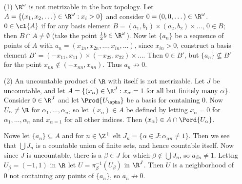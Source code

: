 \begin{example}
    \begin{enumerate}
        \item[(1)] $\R^{\omega}$ is not metrizable in the box topology. Let $A=\{(x_1,x_2,\dots) \in
            \R^{\omega}:x_i>0\}$ and consider $0=(0,0,\dots) \in \R^{\omega}$. $0 \in \cl{A}$ if
            for any basis element $B=(a_1,b_1) \times (a_2,b_2) \times \dots$, $0 \in B$; then  $B
            \cap A \neq \emptyset$  (take the point $ \frac{1}{2}b \in \R^\omega$). Now let
            $\{a_n\}$ be a sequence of points of $A$ with  $a_n=(x_{1n},x_{2n}, \dots, x_ {in},
            \dots)$, since $x_{in}>0$, construct a basis element $B'=(-x_{11},x_{11}) \times
            (-x_{22},x_{22}) \times \dots$. Then $0 \in B'$, but  $\{a_n\} \not\subseteq B'$ for the
            point $x_{nn} \notin (-x_{nn},x_{nn})$. Thus $a_n \not\rightarrow 0$.

        \item[(2)] An uncountable product of  $\R$ with itself is not metrizable. Let  $J$ be
            uncountable, and let  $A=\{(x_{\alpha}) \in \R^J:x_{\alpha}=1 \text{ for all but
            finitely many } \alpha\}$. Consider $0 \in \R^J$ and let  $\Prod{U_{\apha}}$ be a basis
            for containing $0$. Now  $U_{\alpha} \neq \R$ for $\alpha_1, \dots, \alpha_n$, so let
            $(x_{\alpha}) \in A$ be defined by letting $x_{\alpha}=0$ for $\alpha_1, \dots, \alpha_n$
            and $x_{\alpha=1}$ for all other indices. Then $(x_{\alpha}) \in A \cap
            \Pord{U_{\alpha}}$.

            Nowe let $\{a_n\} \subseteq A$ and for $n \in \Z^+$ elt  $J_n=\{\alpha \in J:
            \alpha_{\alpha n} \neq 1\}$. Then we see that $\bigcup{J_n}$ is a countable union of
            finite sets, and hence countable itself. Now since $J$ is uncountable, there is a
            $\beta \in J$ for which  $\beta \notin \bigcup{J_n}$, so $a_{\beta n} \neq 1$. Lettng
            $U_{\beta}=(-1,1)$ in $\R$ let  $U=\pi_{\beta}^{-1}(U_{\beta})$ in $\R^J$. Then  $U$ is
            a neighborhood of  $0$ not containing  any points of  $\{a_n\}$, so $a_n \not\rightarrow
            0$.
    \end{enumerate}
\end{example}

